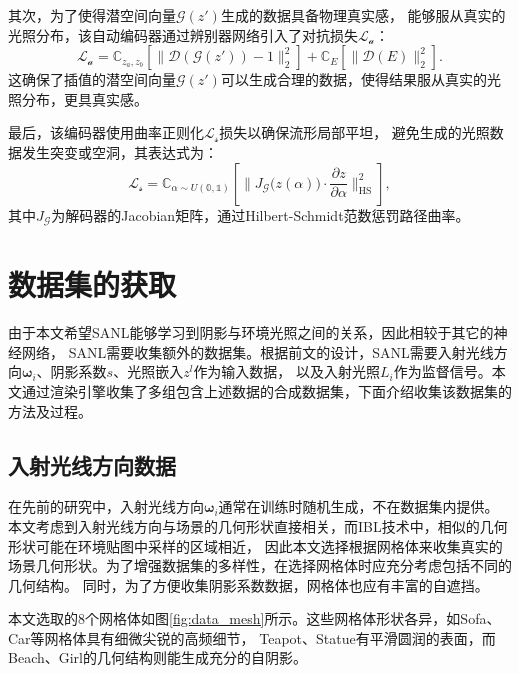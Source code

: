   其次，为了使得潜空间向量$\mathcal{G}\left(z'\right)$生成的数据具备物理真实感，
  能够服从真实的光照分布，该自动编码器通过辨别器网络引入了对抗损失$\mathcal{L}_{\mathcal{a}}$：
  \begin{equation}
  \label{eq:adversarial_loss}
  \mathcal{L}_{\mathcal{a}}=\mathbb{C}_{z_a,z_b}\left[\|\mathcal{D}\left(\mathcal{G}\left(z'\right)\right)-1\|_2^2\right]+\mathbb{C}_E\left[\|\mathcal{D}\left(E\right)\|_2^2\right].
  \end{equation}
  这确保了插值的潜空间向量$\mathcal{G}\left(z'\right)$可以生成合理的数据，使得结果服从真实的光照分布，更具真实感。
  
  最后，该编码器使用曲率正则化$\mathcal{L}_{\mathcal{s}}$损失以确保流形局部平坦，
  避免生成的光照数据发生突变或空洞，其表达式为：
  \begin{equation}
  \label{eq:curvature_loss}
  \mathcal{L}_{\mathcal{s}}=\mathbb{C}_{\alpha\sim U\left(\mathbb{0},\mathbb{1}\right)}\left[\|J_{\mathcal{G}}\bigl(z(\alpha)\bigr)\cdot\frac{\partial z}{\partial\alpha}\|_{\mathrm{HS}}^2\right],
  \end{equation}
  其中$J_{\mathcal{G}}$为解码器的Jacobian矩阵，通过Hilbert-Schmidt范数惩罚路径曲率。

\section{数据集的获取}

由于本文希望SANL能够学习到阴影与环境光照之间的关系，因此相较于其它的神经网络，
SANL需要收集额外的数据集。根据前文的设计，SANL需要入射光线方向${\boldsymbol{\omega}}_i$、阴影系数$s$、光照嵌入$z^l$作为输入数据，
以及入射光照$L_i$作为监督信号。本文通过渲染引擎收集了多组包含上述数据的合成数据集，下面介绍收集该数据集的方法及过程。

\subsection{入射光线方向数据}

在先前的研究中，入射光线方向${\boldsymbol{\omega}}_i$通常在训练时随机生成，不在数据集内提供。
本文考虑到入射光线方向与场景的几何形状直接相关，而IBL技术中，相似的几何形状可能在环境贴图中采样的区域相近，
因此本文选择根据网格体来收集真实的场景几何形状。为了增强数据集的多样性，在选择网格体时应充分考虑包括不同的几何结构。
同时，为了方便收集阴影系数数据，网格体也应有丰富的自遮挡。

本文选取的8个网格体如图\ref{fig:data_mesh}所示。这些网格体形状各异，如Sofa、Car等网格体具有细微尖锐的高频细节，
Teapot、Statue有平滑圆润的表面，而Beach、Girl的几何结构则能生成充分的自阴影。

